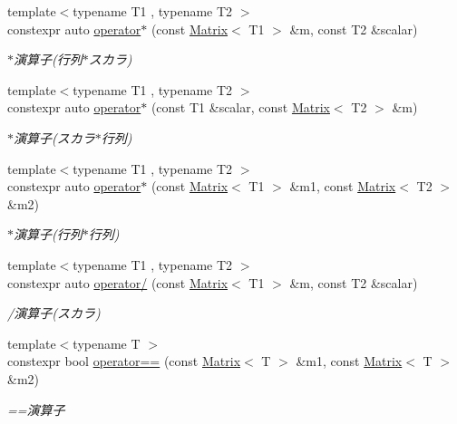 \begin{DoxyCompactItemize}
{\footnotesize template$<$typename T1 , typename T2 $>$ }\\constexpr auto \mbox{\hyperlink{namespacesaki_ad348e50faa98837b804c503c3198afc3}{operator$\ast$}} (const \mbox{\hyperlink{classsaki_1_1_matrix}{Matrix}}$<$ T1 $>$ \&m, const T2 \&scalar)
\begin{DoxyCompactList}\small\item\em $\ast$演算子(行列$\ast$スカラ) \end{DoxyCompactList}\item 
{\footnotesize template$<$typename T1 , typename T2 $>$ }\\constexpr auto \mbox{\hyperlink{namespacesaki_aed1e93efca8468e08d2f569b50c328e0}{operator$\ast$}} (const T1 \&scalar, const \mbox{\hyperlink{classsaki_1_1_matrix}{Matrix}}$<$ T2 $>$ \&m)
\begin{DoxyCompactList}\small\item\em $\ast$演算子(スカラ$\ast$行列) \end{DoxyCompactList}\item 
{\footnotesize template$<$typename T1 , typename T2 $>$ }\\constexpr auto \mbox{\hyperlink{namespacesaki_a8a8f2d1ac91826453735810908a3c32d}{operator$\ast$}} (const \mbox{\hyperlink{classsaki_1_1_matrix}{Matrix}}$<$ T1 $>$ \&m1, const \mbox{\hyperlink{classsaki_1_1_matrix}{Matrix}}$<$ T2 $>$ \&m2)
\begin{DoxyCompactList}\small\item\em $\ast$演算子(行列$\ast$行列) \end{DoxyCompactList}\item 
{\footnotesize template$<$typename T1 , typename T2 $>$ }\\constexpr auto \mbox{\hyperlink{namespacesaki_af54405ace3d571365d95cfecb624c611}{operator/}} (const \mbox{\hyperlink{classsaki_1_1_matrix}{Matrix}}$<$ T1 $>$ \&m, const T2 \&scalar)
\begin{DoxyCompactList}\small\item\em /演算子(スカラ) \end{DoxyCompactList}\item 
{\footnotesize template$<$typename T $>$ }\\constexpr bool \mbox{\hyperlink{namespacesaki_acecebb6fed194d4ca5b6f123b5ed7563}{operator==}} (const \mbox{\hyperlink{classsaki_1_1_matrix}{Matrix}}$<$ T $>$ \&m1, const \mbox{\hyperlink{classsaki_1_1_matrix}{Matrix}}$<$ T $>$ \&m2)
\begin{DoxyCompactList}\small\item\em ==演算子 \end{DoxyCompactList}\item 

\end{DoxyCompactItemize}
